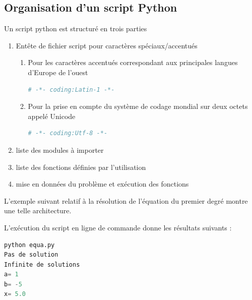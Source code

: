 \documentclass[a4paper,12pt]{article}
\begin{document}
\subsection{Organisation d'un script Python}
Un script python est structur\'e en trois parties
\begin{enumerate}
\item Ent\^ete de fichier script pour caract\`eres sp\'eciaux/accentu\'es
\begin{enumerate}
\item Pour les caract\`eres accentués correspondant aux principales langues d'Europe de l'ouest
\begin{lstlisting}[language={Python}]
# -*- coding:Latin-1 -*-
\end{lstlisting}

\item Pour la prise en compte du syst\`eme de codage mondial sur deux octets appel\'e Unicode
\begin{lstlisting}[language={Python}]
# -*- coding:Utf-8 -*-
\end{lstlisting}
\end{enumerate}
\item liste des modules \`a importer
\item liste des fonctions d\'efinies par l'utilisation
\item mise en donn\'ees du probl\`eme et ex\'ecution des fonctions
\end{enumerate}

L'exemple suivant relatif \`a la r\'esolution de l'\'equation du premier degr\'e montre une telle architecture.




L'ex\'ecution du script en ligne de commande donne les r\'esultats suivants :
\begin{lstlisting}[language={Python}]
python equa.py 
Pas de solution
Infinite de solutions
a= 1
b= -5
x= 5.0
\end{lstlisting}
\end{document}
